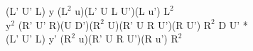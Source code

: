 (L' U' L) y ($\text{L}^2$ u)(L' U L U')(L u') $\text{L}^2$\\
$\text{y}^2$ (R' U' R)(U D')($\text{R}^2$ U)(R' U R U')(R U') $\text{R}^2$ D U' *\\
(L' U' L) y' ($\text{R}^2$ u)(R' U R U')(R u') $\text{R}^2$\\
